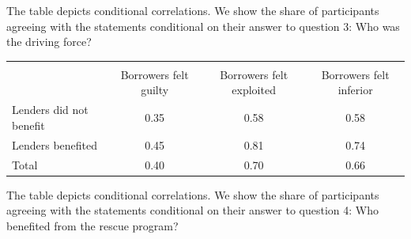   \begin{table}[h!]

 \centering
 \caption{Chain of Causality II}
  \begin{tablenotes} 
 \small
  \item The table depicts conditional correlations. We show the share of participants agreeing with the statements conditional on their answer to question 3: Who was the driving force?
 \end{tablenotes}
 \end{table}

 \begin{table}[h!]
    \centering
 \begin{tabular}{l*{1}{ccc}}
 \hline\hline
                     &\multicolumn{3}{c}{}                  \\
                     &  Borrowers felt guilty &  Borrowers felt exploited & Borrowers felt inferior\\
 \hline
 Lenders did not benefit                  &        0.35&        0.58&        0.58\\
 Lenders benefited                 &        0.45&        0.81&        0.74\\
 Total               &        0.40&        0.70&        0.66\\
 \hline\hline
 \end{tabular}
   \begin{tablenotes} 
 \small
 \item The table depicts conditional correlations. We show the share of participants agreeing with the statements conditional on their answer to question 4: Who benefited from the rescue program?
\end{tablenotes}
 \end{table}
 
